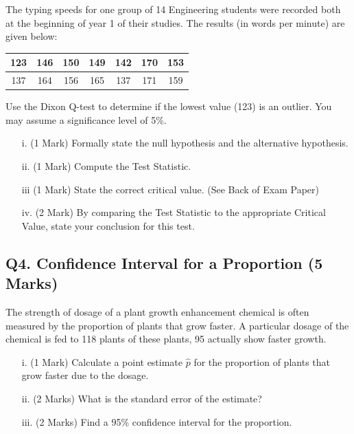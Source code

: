 \documentclass[a4paper,12pt]{article}
\begin{document}
The typing speeds for one group of 14 Engineering students were recorded both at the beginning of year 1 of their studies. The results (in words per minute) are given below:

\begin{center}
	\begin{tabular}{|c|c|c|c|c|c|c|}
		\hline
		123 & 146 & 150 &149 &142 &170& 153\\ \hline
		137 & 164 & 156& 165& 137& 171& 159
		\\ \hline
	\end{tabular}
\end{center}
Use the Dixon Q-test to determine if the lowest value (123) is an outlier. You may assume a significance level of 5\%.

\begin{itemize}
	\item[i.] (1 Mark) Formally state the null hypothesis and the alternative hypothesis.
	\item[ii.] (1 Mark) Compute the Test Statistic.
	\item[iii] (1 Mark) State the correct critical value. (See Back of Exam Paper)
	\item[iv.] (2 Mark) By comparing the Test Statistic to the appropriate Critical Value, state your conclusion for this test.
\end{itemize}
\newpage
\subsection*{Q4. Confidence Interval for a Proportion (5 Marks)}
The strength of dosage of a plant growth enhancement chemical is often measured by the proportion of plants that grow faster. A particular dosage of the chemical is fed to 118 plants of these plants, 95 actually show faster growth.

\begin{itemize}
	\item[i.] (1 Mark) Calculate a point estimate $\hat{p}$ for the proportion of plants that grow faster due to the dosage. 									 
	\item[ii.] (2 Marks)  What is the standard error of the estimate? 			
	\item[iii.] (2 Marks) Find a 95\% confidence interval for the proportion. 					
\end{itemize}
\end{document}
